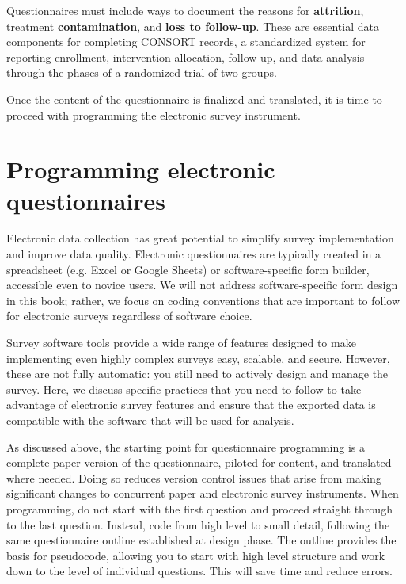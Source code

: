 Questionnaires must include ways to document the reasons for \textbf{attrition}, treatment \textbf{contamination}, and \textbf{loss to follow-up}.
These are essential data components for completing CONSORT records, a standardized system for reporting enrollment, intervention allocation, follow-up, and data analysis through the phases of a randomized trial of two groups.\cite{begg1996improving}

Once the content of the questionnaire is finalized and translated, it is time to proceed with programming the electronic survey instrument.


\section{Programming electronic questionnaires}
Electronic data collection has great potential to simplify survey implementation and improve data quality.
Electronic questionnaires are typically created in a spreadsheet (e.g. Excel or Google Sheets) or software-specific form builder, accessible even to novice users.
We will not address software-specific form design in this book; rather, we focus on coding conventions that are important to follow for electronic surveys regardless of software choice.

Survey software tools provide a wide range of features designed to make implementing even highly complex surveys easy, scalable, and secure.
However, these are not fully automatic: you still need to actively design and manage the survey.
Here, we discuss specific practices that you need to follow to take advantage of electronic survey features and ensure that the exported data is compatible with the software that will be used for analysis.

As discussed above, the starting point for questionnaire programming is a complete paper version of the questionnaire, piloted for content, and translated where needed.
Doing so reduces version control issues that arise from making significant changes to concurrent paper and electronic survey instruments.
When programming, do not start with the first question and proceed straight through to the last question.
Instead, code from high level to small detail, following the same questionnaire outline established at design phase.
The outline provides the basis for pseudocode, allowing you to start with high level structure and work down to the level of individual questions. This will save time and reduce errors.


